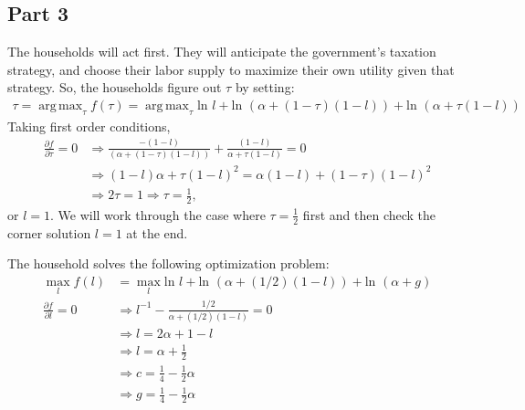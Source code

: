 \documentclass[11pt]{article} %
\DeclareMathOperator*{\argmax}{arg\,max}
\begin{document}
%

\subsection{Part 3}
The households will act first. They will anticipate the government's taxation strategy, and choose their labor supply to maximize their own utility given that strategy. So, the households figure out $\tau$ by setting:
\begin{align*}
\tau = \argmax_{\tau} f(\tau) = \argmax_{\tau} \text{ln }l +\text{ln }(\alpha + (1-\tau) (1-l)) +\text{ln }(\alpha + \tau(1-l)) 
\end{align*}
Taking first order conditions,
\begin{align*}
\frac{\partial f}{\partial \tau} = 0 &\Rightarrow \frac{-(1-l)}{(\alpha + (1-\tau) (1-l))} + \frac{(1-l)}{\alpha + \tau(1-l)} = 0\\
&\Rightarrow (1-l)\alpha + \tau (1-l)^2 = \alpha(1-l) + (1-\tau)(1-l)^2 \\
&\Rightarrow 2\tau = 1 \Rightarrow \tau = \frac{1}{2},
\end{align*}
or $l=1$. We will work through the case where $\tau=\frac{1}{2}$ first and then check the corner solution $l=1$ at the end.

The household solves the following optimization problem:
\begin{align*}
\max_{l} f(l) &= \max_{l} \text{ln }l +\text{ln }(\alpha + (1/2) (1-l)) +\text{ln }(\alpha + g) \\
\frac{\partial f}{\partial l} = 0 &\Rightarrow l^{-1} -\frac{1/2}{\alpha + (1/2)(1-l)} = 0\\
&\Rightarrow l = 2\alpha + 1 - l \\
&\Rightarrow l = \alpha + \frac{1}{2}\\
&\Rightarrow c = \frac{1}{4} - \frac{1}{2}\alpha \\
&\Rightarrow g = \frac{1}{4} - \frac{1}{2}\alpha
\end{align*}
\end{document}
